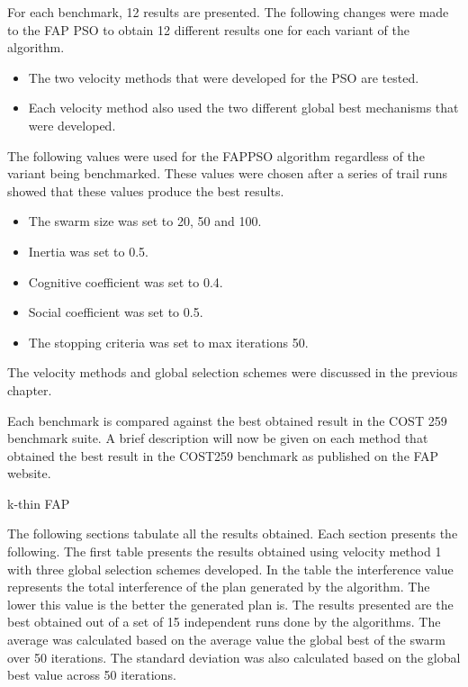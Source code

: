 For each benchmark, 12 results are presented. The following changes were made to the FAP PSO to obtain 12 different results one for each variant of the algorithm.
\begin{itemize}
\item The two velocity methods that were developed for the PSO are tested.
\item Each velocity method also used the two different global best mechanisms that were developed.
\end{itemize}
The following values were used for the FAPPSO algorithm regardless of the variant being benchmarked. These values were chosen after a series of trail runs showed that these values produce the best results.
\begin{itemize}
\item The swarm size was set to 20, 50 and 100.
\item Inertia was set to 0.5.
\item Cognitive coefficient was set to 0.4.
\item Social coefficient was set to 0.5.
\item The stopping criteria was set to max iterations 50.
\end{itemize}
The velocity methods and global selection schemes were discussed in the previous chapter.

Each benchmark is compared against the best obtained result in the COST 259 benchmark suite. A brief description will now be given on each method that obtained the best result in the COST259 benchmark as published on the FAP website.
\begin{description}
    \item{k-thin FAP}
\end{description}

The following sections tabulate all the results obtained. Each section presents the following. The first table presents the results obtained using velocity method 1 with three global selection schemes developed. In the table the interference value represents the total interference of the plan generated by the algorithm. The lower this value is the better the generated plan is. The results presented are the best obtained out of a set of 15 independent runs done by the algorithms. The average was calculated based on the average value the global best of the swarm over 50 iterations. The standard deviation was also calculated based on the global best value across 50 iterations.
